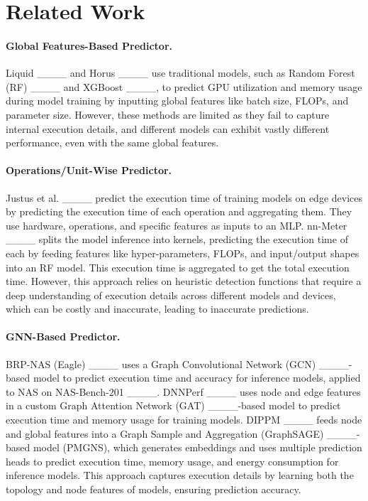 \section{Related Work}
\label{sec:related work} 
\paragraph{Global Features-Based Predictor.} 
Liquid ____ and Horus ____ use traditional models, such as Random Forest (RF) ____ and XGBoost ____, to predict GPU utilization and memory usage during model training by inputting global features like batch size, FLOPs, and parameter size. However, these methods are limited as they fail to capture internal execution details, and different models can exhibit vastly different performance, even with the same global features.

\paragraph{Operations/Unit-Wise Predictor.}
Justus et al. ____ predict the execution time of training models on edge devices by predicting the execution time of each operation and aggregating them. They use hardware, operations, and specific features as inputs to an MLP. nn-Meter ____ splits the model inference into kernels, predicting the execution time of each by feeding features like hyper-parameters, FLOPs, and input/output shapes into an RF model. This execution time is aggregated to get the total execution time. However, this approach relies on heuristic detection functions that require a deep understanding of execution details across different models and devices, which can be costly and inaccurate, leading to inaccurate predictions.

\paragraph{GNN-Based Predictor.}
BRP-NAS (Eagle) ____ uses a Graph Convolutional Network (GCN) ____-based model to predict execution time and accuracy for inference models, applied to NAS on NAS-Bench-201 ____. 
DNNPerf ____ uses node and edge features in a custom Graph Attention Network (GAT) ____-based model to predict execution time and memory usage for training models. 
DIPPM ____ feeds node and global features into a Graph Sample and Aggregation (GraphSAGE) ____-based model (PMGNS), which generates embeddings and uses multiple prediction heads to predict execution time, memory usage, and energy consumption for inference models. 
This approach captures execution details by learning both the topology and node features of models, ensuring prediction accuracy.